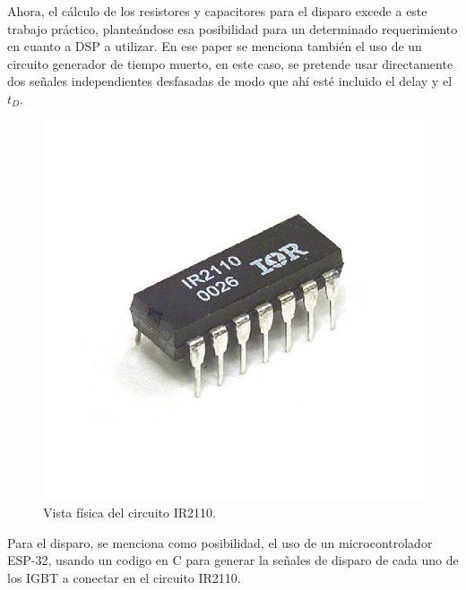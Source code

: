 Ahora, el cálculo de los resistores y capacitores para el disparo excede a este trabajo práctico, planteándose esa posibilidad para un determinado requerimiento en cuanto a DSP a utilizar. En ese paper se menciona también el uso de un circuito generador de tiempo muerto, en este caso, se pretende usar directamente dos señales independientes desfasadas de modo que ahí esté incluido el delay y el $t_D$.

\begin{figure}
	\centering
	\includegraphics[width=0.3\linewidth]{img/ir2110_c}
	\caption{Vista física del circuito IR2110.}
	\label{fig:ir2110c}
\end{figure}


Para el disparo, se menciona como posibilidad, el uso de un microcontrolador ESP-32, usando un codigo en C para generar la señales de disparo de cada uno de los IGBT a conectar en el circuito IR2110.


